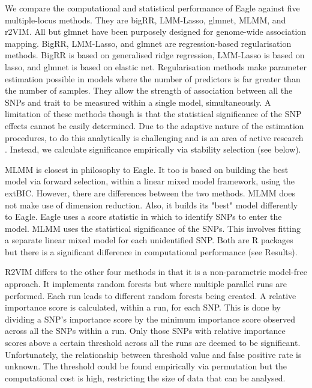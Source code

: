 \documentclass{article}
\begin{document}
We compare the computational and statistical performance of Eagle against five multiple-locus methods. They are bigRR, LMM-Lasso, glmnet, 
MLMM, and r2VIM.  All but glmnet have been purposely designed for genome-wide association mapping. 
BigRR, LMM-Lasso, and glmnet are regression-based regularisation 
methods. BigRR is based on generalised ridge regression, LMM-Lasso is based on lasso, and glmnet is based on elastic net. 
Regularisation methods make parameter estimation possible in models  where the number of predictors is far greater than the number of samples. 
They allow the strength of association between all the SNPs and trait to be measured within a single model, simultaneously. 
A limitation of these methods though is that the statistical significance of the SNP effects cannot be easily determined. 
 Due to the adaptive nature of the estimation procedures, to do this 
analytically is challenging and is an area of active research \cite{lockhart2014significance}. Instead, we calculate significance empirically via 
stability selection (see below). 

MLMM is closest in philosophy to Eagle. It too is based on building the best model via forward selection, 
within  a linear mixed model framework, using the 
extBIC. However, there are differences between the two methods.  MLMM does not make use of dimension reduction. Also, it builds its "best" 
model differently to Eagle.  Eagle uses a score statistic in which to identify SNPs to enter the model.
MLMM uses the statistical significance of the SNPs. This involves fitting a separate linear mixed model for each unidentified SNP. 
Both are R packages but there is a significant difference in computational performance (see Results). 
  
R2VIM differs to the other four methods in that it is a non-parametric model-free approach. It implements  
random forests but where multiple parallel runs are performed. Each run leads to 
different random forests being created.  A relative importance score is calculated, within a run,  for each SNP. This is done by dividing a SNP's 
importance score by the minimum importance score observed across all the SNPs within a run. 
Only those SNPs with relative importance scores above a certain threshold across all the runs are deemed to be significant. 
Unfortunately, the relationship between threshold value and false positive rate is unknown. The threshold could be found empirically via permutation 
but the computational cost is high, restricting the size of data that can be analysed. 
\end{document}
